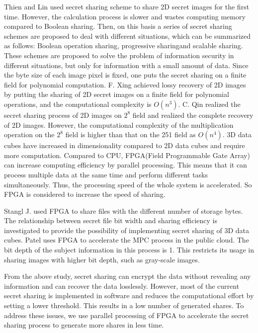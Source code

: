 Thien and Lin used secret sharing scheme to share 2D secret images for the first time\cite{thien2002secret}. However, the calculation process is slower and wastes computing memory compared to Boolean sharing. Then, on this basis a series of secret sharing schemes are proposed to deal with different situations, which can be summarized as follows: Boolean operation sharing\cite{kabirirad2019improvement,kumar2022extending}, progressive sharing\cite{xiong2021cp,prasetyo2019xor}and scalable sharing\cite{wang2006secret}. These schemes are proposed to solve the problem of information security in different situations, but only for information with a small amount of data. Since the byte size of each image pixel is fixed, one puts the secret sharing on a finite field for polynomial computation\cite{beimel1994universally,hansen2017secret}. F. Xing achieved lossy recovery of 2D images by putting the sharing of 2D secret images on a finite field for polynomial operations, and the computational complexity is $O\left(n^{3}\right)$\cite{xing2022information}. C. Qin realized the secret sharing process of 2D images on $2^{8}$ field and realized the complete recovery of 2D images\cite{qin2021reversible}. However, the computational complexity of the multiplication operation on the $2^{8}$ field is higher than that on the 251 field as $O\left(n^{4}\right)$. 3D data cubes have increased in dimensionality compared to 2D data cubes and require more computation. {\color{red}Compared to CPU, FPGA(Field Programmable Gate Array) can increase computing efficiency by parallel processing. This means that it can process multiple data at the same time and perform different tasks simultaneously. Thus, the processing speed of the whole system is accelerated.} So FPGA is considered to increase the speed of sharing.

Stangl J. used FPGA to share files with the different number of storage bytes\cite{stangl2018fast}. The relationship between secret file bit width and sharing efficiency is investigated to provide the possibility of implementing secret sharing of 3D data cubes. Patel uses FPGA to accelerate the MPC process in the public cloud. The bit depth of the subject information in this process is 1\cite{patel2020arithmetic}. This restricts its usage in sharing images with higher bit depth, such as gray-scale images.

From the above study, secret sharing can encrypt the data without revealing any information and can recover the data losslessly. However, most of the current secret sharing is implemented in software and reduces the computational effort by setting a lower threshold. This results in a low number of generated shares. To address these issues, we use parallel processing of FPGA to accelerate the secret sharing process to generate more shares in less time.


